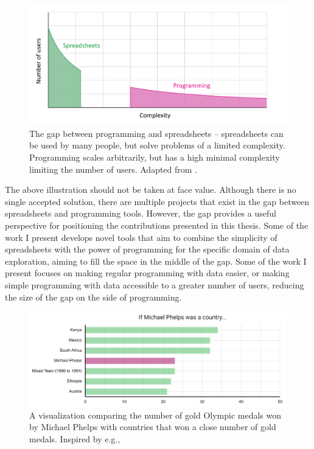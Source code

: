 \documentclass[fleqn,11pt]{report}
\theoremstyle{definition}
\begin{document}
\begin{figure}[h!]
\centering
\includegraphics[scale=0.25]{img/gap.png}
\vspace{-0.5em}
\caption{The gap between programming and spreadsheets -- spreadsheets can be used by many people,
but solve problems of a limited complexity. Programming scales arbitrarily, but has a high minimal
complexity limiting the number of users. Adapted from \citet{edwards-2015-transcript}.}
\label{fig:gap}
\end{figure}

The above illustration should not be taken at face value. Although there is no single accepted
solution, there are multiple projects that exist in the gap between spreadsheets and programming
tools. However, the gap provides a useful perspective for positioning the contributions presented
in this thesis. Some of the work I present develops novel tools that aim to combine the simplicity
of spreadsheets with the power of programming for the specific domain of data exploration, aiming to
fill the space in the middle of the gap. Some of the work I present focuses on making regular
programming with data easier, or making simple programming with data accessible to a greater
number of users, reducing the size of the gap on the side of programming.

\begin{figure}[t]
\includegraphics[scale=0.345]{img/phelps.png}
\caption{A visualization comparing the number of gold Olympic medals won by Michael Phelps
 with countries that won a close number of gold medals. Inspired by e.g., \cite{npr-2016-phelps}}
\label{fig:phelps}
\end{figure}
\end{document}
